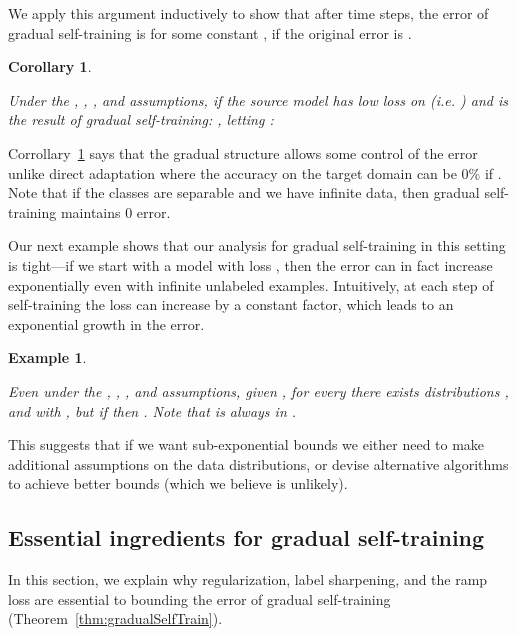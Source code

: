 \documentclass[11pt]{article}
\newtheorem{example}[theorem]{Example}
\newtheorem{corollary}[theorem]{Corollary}
\begin{document}
We apply this argument inductively to show that after  time steps, the error of gradual self-training is  for some constant , if the original error is .

\newcommand{\gradualSelfTrainCorollaryText}{
  Under the \sepAssump, \noLabShiftAssump, \gradShiftAssump, and \boundedAssump{} assumptions, if the source model  has low loss  on  (i.e. ) and  is the result of gradual self-training: , letting :

}

\begin{corollary}
\label{cor:gradualSelfTrain}
\gradualSelfTrainCorollaryText{}
\end{corollary}

Corrollary~\ref{cor:gradualSelfTrain} says that the gradual structure allows some control of the error unlike direct adaptation where the accuracy on the target domain can be 0\% if . Note that if the classes are separable and we have infinite data, then gradual self-training maintains 0 error.


Our next example shows that our analysis for gradual self-training in this setting is tight---if we start with a model with loss , then the error can in fact increase exponentially even with infinite unlabeled examples.
Intuitively, at each step of self-training the loss can increase by a constant factor, which leads to an exponential growth in the error.

\newcommand{\selfTrainingExponentialText}{
  Even under the \sepAssump, \noLabShiftAssump, \gradShiftAssump, and \boundedAssump{} assumptions,
  given , for every  there exists distributions , and  with , but if  then . Note that  is always in .
}

\begin{example}
\label{ex:selfTrainingExponential}
\selfTrainingExponentialText{}
\end{example}

This suggests that if we want sub-exponential bounds we either need to make additional assumptions on the data distributions, or devise alternative algorithms to achieve better bounds (which we believe is unlikely).

\subsection{Essential ingredients for gradual self-training}
\label{subsec:essential_ingredients_theory}

In this section, we explain why regularization, label sharpening, and the ramp loss are essential to bounding the error of gradual self-training (Theorem~\ref{thm:gradualSelfTrain}).
\end{document}
